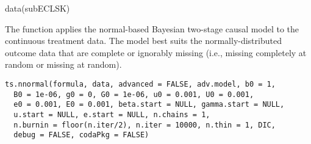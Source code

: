 \documentclass[a4paper]{book}
\begin{document}
%
\begin{Examples}
\begin{ExampleCode}

data(subECLSK)


\end{ExampleCode}
\end{Examples}
%
\begin{Description}\relax
The  function applies the normal-based Bayesian two-stage causal model
to the continuous treatment data. The model best suits the normally-distributed outcome data
that are complete or ignorably missing (i.e., missing completely at random or missing at random).
\end{Description}
%
\begin{Usage}
\begin{verbatim}
ts.nnormal(formula, data, advanced = FALSE, adv.model, b0 = 1,
  B0 = 1e-06, g0 = 0, G0 = 1e-06, u0 = 0.001, U0 = 0.001,
  e0 = 0.001, E0 = 0.001, beta.start = NULL, gamma.start = NULL,
  u.start = NULL, e.start = NULL, n.chains = 1,
  n.burnin = floor(n.iter/2), n.iter = 10000, n.thin = 1, DIC,
  debug = FALSE, codaPkg = FALSE)
\end{verbatim}
\end{Usage}
%
\end{document}
